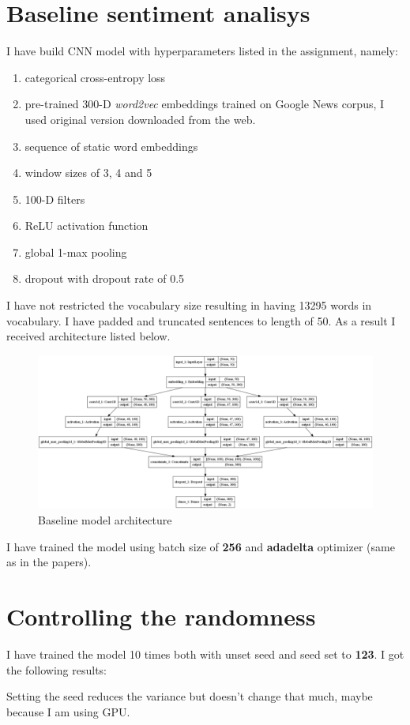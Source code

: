 \documentclass{article}
\begin{document}
\section{Baseline sentiment analisys}
I have build CNN model with hyperparameters listed in the assignment, namely:
\begin{enumerate}
    \item categorical cross-entropy loss
    \item pre-trained 300-D \textit{word2vec} embeddings trained on Google News corpus,
    I used original version downloaded from the web.
    \item sequence of static word embeddings
    \item window sizes of 3, 4 and 5
    \item 100-D filters
    \item ReLU activation function
    \item global 1-max pooling
    \item dropout with dropout rate of 0.5
\end{enumerate}
I have not restricted the vocabulary size resulting in having 13295 words in vocabulary.
I have padded and truncated sentences to length of 50. As a result I received architecture listed below.
\newpage
\begin{figure}[h]
    \centering
    \includegraphics[width=1\textwidth]{../figures/baseline.png}
    \caption{Baseline model architecture}
\end{figure}
I have trained the model using batch size of \textbf{256} and \textbf{adadelta} optimizer 
(same as in the papers).
\section{Controlling the randomness}
I have trained the model 10 times both with unset seed and seed set to \textbf{123}. I got
the following results:
\begin{figure}[h]
    \centering
    
\end{figure}
Setting the seed reduces the variance but doesn't change that much, maybe because I am using GPU.
\end{document}
